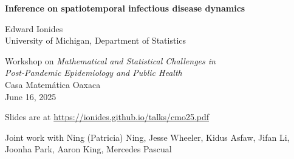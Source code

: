 \documentclass{beamer}
\begin{document}
\begin{frame}
  
\begin{center}
  {\Large\bf Inference on spatiotemporal infectious disease dynamics}


\vspace{2mm}

Edward Ionides\\
University of Michigan, Department of Statistics

\vspace{8mm}

Workshop on {\it Mathematical and Statistical Challenges in \\
  Post-Pandemic Epidemiology and Public Health}\\
Casa Matem\'{a}tica Oaxaca\\
June 16, 2025


\hspace{3mm}

Slides are at \url{https://ionides.github.io/talks/cmo25.pdf}

\vspace{8mm}

Joint work with
Ning (Patricia) Ning, Jesse Wheeler, Kidus Asfaw, Jifan Li, Joonha Park, Aaron King, Mercedes Pascual

\end{center}

\end{frame}
\end{document}
